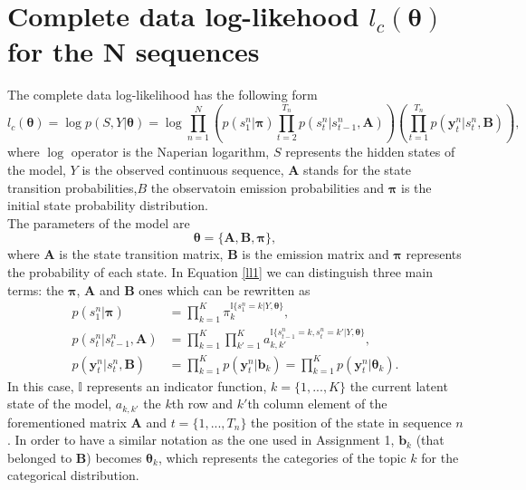 \documentclass[12pt]{article}
\newcommand{\indicator}{\mathbb{I}}
\begin{document}
\section{Complete data log-likehood $l_{c}\left(\boldsymbol\theta\right)$ for the N sequences}
The complete data log-likelihood has the following form
\begin{equation}
\label{ll1}
l_{c}\left(\boldsymbol\theta\right) = \log p ( S , Y | \boldsymbol\theta ) = \log \prod _ { n = 1 } ^ { N } \left( p \left( s _ { 1 } ^ { n } | \boldsymbol\pi \right) \prod _ { t = 2 } ^ { T _ { n } } p \left( s _ { t } ^ { n } | s _ { t - 1 } ^ { n } , \mathbf { A } \right) \right) \left( \prod _ { t = 1 } ^ { T _ { n } } p \left( \mathbf { y } _ { t } ^ { n } | s _ { t } ^ { n } , \mathbf { B } \right) \right),
\end{equation}
where $\log$ operator is the Naperian logarithm, $S$ represents the hidden states of the model, $Y$ is the observed continuous sequence, $\mathbf { A }$ stands for the state transition probabilities,$B$ the observatoin emission probabilities and $\boldsymbol\pi$ is the initial state probability distribution.\\
\noindent The parameters of the model are
\begin{equation}
\boldsymbol\theta = \{ \mathbf { A } , \mathbf { B } , \boldsymbol\pi \},
\end{equation}
where $\mathbf { A }$  is the state transition matrix, $\mathbf { B } $ is the emission matrix and  $\boldsymbol\pi $ represents the probability of each state. In Equation \ref{ll1} we can distinguish three main terms: the $\boldsymbol\pi$, $\mathbf { A }$ and $\mathbf { B } $ ones which can be rewritten as
\begin{align}
p \left( s _ { 1 } ^ { n } | \boldsymbol\pi \right) &= \prod\limits_{k=1}^{K}\pi_{k}^{\indicator \lbrace s_{1}^{n}=k|Y,\boldsymbol\theta\rbrace},\\
p \left( s _ { t } ^ { n } | s _ { t - 1 } ^ { n } , \mathbf { A } \right) &= \prod\limits_{k=1}^{K} \prod\limits_{k'=1}^{K}a_{k,k'}^{\indicator \lbrace s_{t-1}^{n}=k,s_{t}^{n}=k'|Y,\boldsymbol\theta\rbrace},\\
p \left( \mathbf { y } _ { t } ^ { n } | s _ { t } ^ { n } , \mathbf { B } \right) &= \prod\limits_{k=1}^{K} p \left( \mathbf { y } _ { t } ^ { n } | \boldsymbol b_{k} \right) = \prod\limits_{k=1}^{K} p \left( \mathbf { y } _ { t } ^ { n } | \boldsymbol\theta_{k} \right) \label{p3LL}.
\end{align}
In this case, $\indicator$ represents an indicator function, $k = \lbrace{1,...,K}\rbrace$ the current latent state of the model, $a_{k,k'}$ the $k$th row and $k'$th column element of the forementioned matrix $\mathbf { A }$ and $t = \lbrace{1,...,T_{n}}\rbrace$ the position of the state in sequence $n$. In order to have a similar notation as the one used in Assignment 1,  $\mathbf{b}_{k}$ (that belonged to $\mathbf{B}$) becomes $\boldsymbol\theta_{k}$, which represents the categories of the topic $k$ for the categorical distribution.\\
\end{document}
